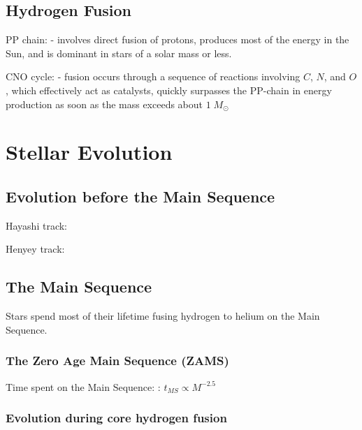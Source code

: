\documentclass[a4paper, 11pt, landscape]{article}
\begin{document}
\begin{multicols*}{3}
\subsection{Hydrogen Fusion}
\begin{compactenum}
	\item [\color{red}PP chain:] - involves direct fusion of protons, produces most of the energy in the Sun, and is dominant in stars of a solar mass or less.
	\item [\color{red}CNO cycle:] - fusion occurs through a sequence of reactions involving $C$, $N$, and $O$, which effectively act as catalysts, quickly surpasses the PP-chain in energy production as soon as the mass exceeds about $1 \; M_{\odot}$
\end{compactenum}

\section{Stellar Evolution}
\subsection{Evolution before the Main Sequence}
\begin{compactenum}
	\item [\color{red}Hayashi track:]
	\item [\color{red}Henyey track:]
\end{compactenum}

\subsection{The Main Sequence}
Stars spend most of their lifetime fusing hydrogen to helium on the Main Sequence.
\subsubsection{The Zero Age Main Sequence (ZAMS)}
\begin{compactenum}
	\item [\color{red}Time spent on the Main Sequence:]: $t_{MS} \propto M^{-2.5}$
\end{compactenum}
\subsubsection{Evolution during core hydrogen fusion}


\end{multicols*}
\end{document}
